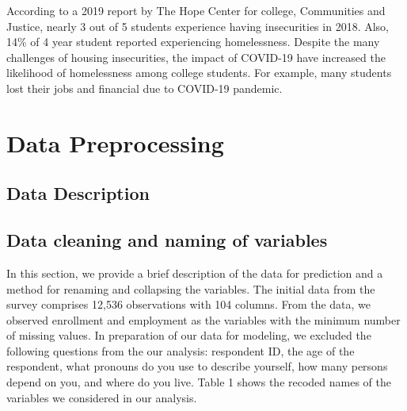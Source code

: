 \documentclass[
  10pt,
]{article}
\begin{document}
According to a 2019 report by The Hope Center for college, Communities and Justice, nearly 3 out of 5 students experience having insecurities in 2018. Also, 14\% of 4 year student reported experiencing homelessness. Despite the many challenges of housing insecurities, the impact of COVID-19 have increased the likelihood of homelessness among college students. For example, many students lost their jobs and financial due to COVID-19 pandemic.

\section{Data Preprocessing}

\subsection{ Data Description}

\subsection{Data cleaning and naming of variables}

In this section, we provide a brief description of the data for prediction and a method for renaming and collapsing the variables. The initial data from the survey comprises 12,536 observations with 104 columns. From the data, we observed enrollment and employment as the variables with the minimum number of missing values. In preparation of our data for modeling, we excluded the following questions from the our analysis: respondent ID, the age of the respondent, what pronouns do you use to describe yourself, how many persons depend on you, and where do you live. Table 1 shows the recoded names of the variables we considered in our analysis.
\end{document}
